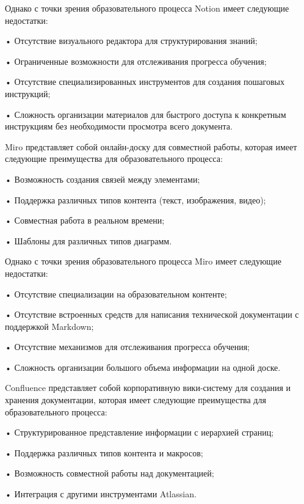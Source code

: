 {  \par \redline Однако с точки зрения образовательного процесса Notion имеет следующие недостатки:
  
  \par \redline • Отсутствие визуального редактора для структурирования знаний;
  \par \redline • Ограниченные возможности для отслеживания прогресса обучения;
  \par \redline • Отсутствие специализированных инструментов для создания пошаговых инструкций;
  \par \redline • Сложность организации материалов для быстрого доступа к конкретным инструкциям без необходимости просмотра всего документа.

  \par \redline Miro представляет собой онлайн-доску для совместной работы, которая имеет следующие преимущества для образовательного процесса:
  
  \par \redline • Возможность создания связей между элементами;
  \par \redline • Поддержка различных типов контента (текст, изображения, видео);
  \par \redline • Совместная работа в реальном времени;
  \par \redline • Шаблоны для различных типов диаграмм.
  
  \par \redline Однако с точки зрения образовательного процесса Miro имеет следующие недостатки:
  
  \par \redline • Отсутствие специализации на образовательном контенте;
  \par \redline • Отсутствие встроенных средств для написания технической документации с поддержкой Mark\-down;
  \par \redline • Отсутствие механизмов для отслеживания прогресса обучения;
  \par \redline • Сложность организации большого объема информации на одной доске.

  \par \redline Confluence представляет собой корпоративную вики-систему для создания и хранения документации, которая имеет следующие преимущества для образовательного процесса:
  
  \par \redline • Структурированное представление информации с иерархией страниц;
  \par \redline • Поддержка различных типов контента и макросов;
  \par \redline • Возможность совместной работы над документацией;
  \par \redline • Интеграция с другими инструментами Atlassian.
  
}
